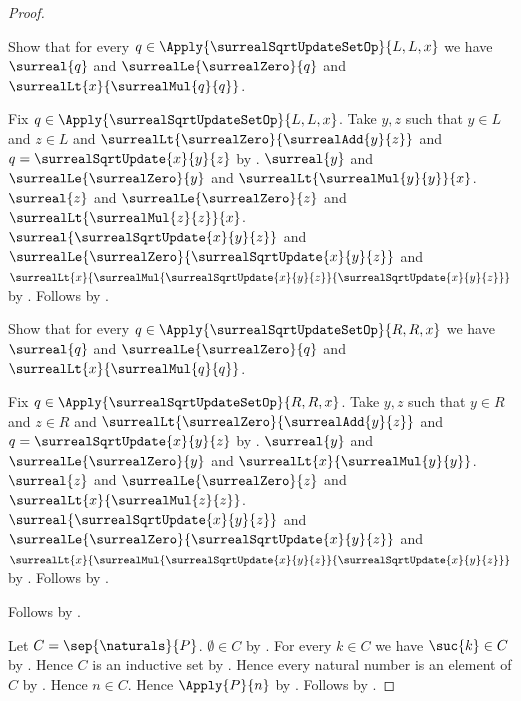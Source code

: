 \begin{proof}
\begin{subproof}
        Show that for every
            $q\in\Apply{\surrealSqrtUpdateSetOp}{L,L,x}$ we have
            $\surreal{q}$ and $\surrealLe{\surrealZero}{q}$ and
                $\surrealLt{x}{\surrealMul{q}{q}}$.
        \begin{subproof}
            Fix $q\in\Apply{\surrealSqrtUpdateSetOp}{L,L,x}$.
            Take $y,z$ such that $y\in L$ and $z\in L$ and
                $\surrealLt{\surrealZero}{\surrealAdd{y}{z}}$ and
                $q=\surrealSqrtUpdate{x}{y}{z}$
                by .
            $\surreal{y}$ and $\surrealLe{\surrealZero}{y}$ and
                $\surrealLt{\surrealMul{y}{y}}{x}$.
            $\surreal{z}$ and $\surrealLe{\surrealZero}{z}$ and
                $\surrealLt{\surrealMul{z}{z}}{x}$.
            $\surreal{\surrealSqrtUpdate{x}{y}{z}}$ and
                $\surrealLe{\surrealZero}{\surrealSqrtUpdate{x}{y}{z}}$ and
                $\surrealLt{x}{
                    \surrealMul{\surrealSqrtUpdate{x}{y}{z}}{
                        \surrealSqrtUpdate{x}{y}{z}}}$
                by .
            Follows by \auto.
        \end{subproof}

        Show that for every
            $q\in\Apply{\surrealSqrtUpdateSetOp}{R,R,x}$ we have
            $\surreal{q}$ and $\surrealLe{\surrealZero}{q}$ and
                $\surrealLt{x}{\surrealMul{q}{q}}$.
        \begin{subproof}
            Fix $q\in\Apply{\surrealSqrtUpdateSetOp}{R,R,x}$.
            Take $y,z$ such that $y\in R$ and $z\in R$ and
                $\surrealLt{\surrealZero}{\surrealAdd{y}{z}}$ and
                $q=\surrealSqrtUpdate{x}{y}{z}$
                by .
            $\surreal{y}$ and $\surrealLe{\surrealZero}{y}$ and
                $\surrealLt{x}{\surrealMul{y}{y}}$.
            $\surreal{z}$ and $\surrealLe{\surrealZero}{z}$ and
                $\surrealLt{x}{\surrealMul{z}{z}}$.
            $\surreal{\surrealSqrtUpdate{x}{y}{z}}$ and
                $\surrealLe{\surrealZero}{\surrealSqrtUpdate{x}{y}{z}}$ and
                $\surrealLt{x}{
                    \surrealMul{\surrealSqrtUpdate{x}{y}{z}}{
                        \surrealSqrtUpdate{x}{y}{z}}}$
                by .
            Follows by \auto.
        \end{subproof}

        Follows by
            .
    \end{subproof}

    Let $C=\sep{\naturals}{P}$.
    $\emptyset\in C$ by
        .
    For every $k\in C$ we have $\suc{k}\in C$
        by .
    Hence $C$ is an inductive set by .
    Hence every natural number is an element of $C$
        by .
    Hence $n\in C$.
    Hence $\Apply{P}{n}$ by .
    Follows by \auto.
\end{proof}

